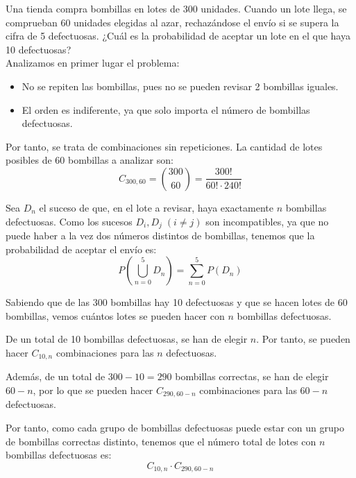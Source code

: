 \begin{ejercicio} \label{ej:3.Ejercicio9}
    Una tienda compra bombillas en lotes de 300 unidades. Cuando un lote llega, se comprueban 60 unidades elegidas al azar, rechazándose el envío si se supera la cifra de 5 defectuosas. ¿Cuál es la probabilidad de aceptar un lote en el que haya 10 defectuosas?\\

    Analizamos en primer lugar el problema:
    \begin{itemize}
        \item No se repiten las bombillas, pues no se pueden revisar 2 bombillas iguales.
        \item El orden es indiferente, ya que solo importa el número de bombillas defectuosas.
    \end{itemize}
    Por tanto, se trata de combinaciones sin repeticiones. La cantidad de lotes posibles de $60$ bombillas a analizar son:
    \begin{equation*}
        C_{300,60} = \binom{300}{60} = \frac{300!}{60!\cdot 240!}
    \end{equation*}

    Sea $D_n$ el suceso de que, en el lote a revisar, haya exactamente $n$ bombillas defectuosas. Como los sucesos $D_i,D_j\; (i\neq j)$ son incompatibles, ya que no puede haber a la vez dos números distintos de bombillas, tenemos que la probabilidad de aceptar el envío es:
    \begin{equation*}
        P\left(\bigcup_{n=0}^5 D_n\right) = \sum_{n=0}^5 P(D_n)
    \end{equation*}

    Sabiendo que de las 300 bombillas hay 10 defectuosas y que se hacen lotes de $60$ bombillas, vemos cuántos lotes se pueden hacer con $n$ bombillas defectuosas.
    
    De un total de 10 bombillas defectuosas, se han de elegir $n$. Por tanto, se pueden hacer $C_{10,n}$ combinaciones para las $n$ defectuosas.
    
    Además, de un total de $300-10=290$ bombillas correctas, se han de elegir $60-n$, por lo que se pueden hacer $C_{290,60-n}$ combinaciones para las $60-n$ defectuosas.

    Por tanto, como cada grupo de bombillas defectuosas puede estar con un grupo de bombillas correctas distinto, tenemos que el número total de lotes con $n$ bombillas defectuosas es:
    \begin{equation*}
        C_{10,n}\cdot C_{290,60-n}
    \end{equation*}
    

\end{ejercicio}
